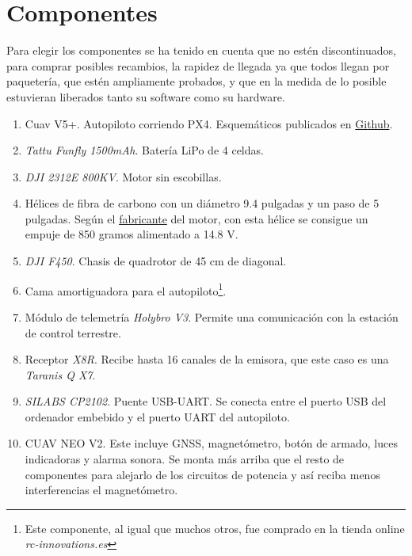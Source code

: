 \section{Componentes}
Para elegir los componentes se ha tenido en cuenta que no estén discontinuados, para comprar posibles recambios, la rapidez de llegada ya que todos llegan por paquetería, que estén ampliamente probados, y que en la medida de lo posible estuvieran liberados tanto su software como su hardware. 
\figComp

\begin{enumerate}
\item Cuav V5+. Autopiloto corriendo PX4. Esquemáticos publicados en \href{https://github.com/ArduPilot/Schematics/tree/master/CUAV/V5_Autopilot/V5\%2B}{Github}.
\item \textit{Tattu Funfly 1500mAh}. Batería LiPo de 4 celdas.
\item \textit{DJI 2312E 800KV}. Motor sin escobillas.
\item Hélices de fibra de carbono con un diámetro 9.4 pulgadas y un paso de 5 pulgadas. Según el \href{https://www.dji.com/e305/spec}{fabricante} del motor, con esta hélice se consigue un empuje de 850 gramos alimentado a 14.8 V.
\item \textit{DJI F450}. Chasis de quadrotor de 45 cm de diagonal. 
\item Cama amortiguadora para el autopiloto\footnote{Este componente, al igual que muchos otros, fue comprado en la tienda online \textit{rc-innovations.es}}.
\item Módulo de telemetría \textit{Holybro V3}. Permite una comunicación con la estación de control terrestre.
\item Receptor \textit{X8R}. Recibe hasta 16 canales de la emisora, que este caso es una \textit{Taranis Q X7}. 
\item \textit{SILABS CP2102}. Puente USB-UART. Se conecta entre el puerto USB del ordenador embebido y el puerto UART del autopiloto.
\item CUAV NEO V2. Este incluye GNSS, magnetómetro, botón de armado, luces indicadoras y alarma sonora. Se monta más arriba que el resto de componentes para alejarlo de los circuitos de potencia y así reciba menos interferencias el magnetómetro.


\end{enumerate}
